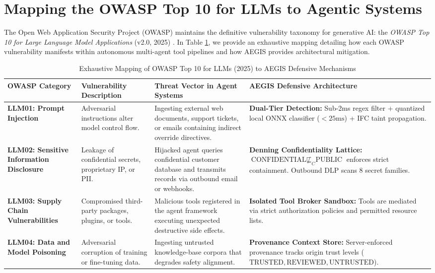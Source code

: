 \section{Mapping the OWASP Top 10 for LLMs to Agentic Systems}
The Open Web Application Security Project (OWASP) maintains the definitive vulnerability taxonomy for generative AI: the \textit{OWASP Top 10 for Large Language Model Applications} (v2.0, 2025) \cite{owasp2025top10llm}. In Table \ref{tab:owasp}, we provide an exhaustive mapping detailing how each OWASP vulnerability manifests within autonomous multi-agent tool pipelines and how AEGIS provides architectural mitigation.

\begin{table}[htbp]
\centering
\scriptsize
\caption{Exhaustive Mapping of OWASP Top 10 for LLMs (2025) to AEGIS Defensive Mechanisms}
\label{tab:owasp}
\begin{tabularx}{\textwidth}{p{2.2cm}p{3.0cm}p{4.2cm}X}
\toprule
\textbf{OWASP Category} & \textbf{Vulnerability Description} & \textbf{Threat Vector in Agent Systems} & \textbf{AEGIS Defensive Architecture} \\
\midrule
\textbf{LLM01: Prompt Injection} & Adversarial instructions alter model control flow. & Ingesting external web documents, support tickets, or emails containing indirect override directives. & \textbf{Dual-Tier Detection:} Sub-2ms regex filter + quantized local ONNX classifier ($< 25\text{ms}$) + IFC taint propagation. \\
\addlinespace
\textbf{LLM02: Sensitive Information Disclosure} & Leakage of confidential secrets, proprietary IP, or PII. & Hijacked agent queries confidential customer database and transmits records via outbound email or webhooks. & \textbf{Denning Confidentiality Lattice:} $\text{CONFIDENTIAL} \not\sqsubseteq_C \text{PUBLIC}$ enforces strict containment. Outbound DLP scans 8 secret families. \\
\addlinespace
\textbf{LLM03: Supply Chain Vulnerabilities} & Compromised third-party packages, plugins, or tools. & Malicious tools registered in the agent framework executing unexpected destructive side effects. & \textbf{Isolated Tool Broker Sandbox:} Tools are mediated via strict authorization policies and permitted resource lists. \\
\addlinespace
\textbf{LLM04: Data and Model Poisoning} & Adversarial corruption of training or fine-tuning data. & Ingesting untrusted knowledge-base corpora that degrades safety alignment. & \textbf{Provenance Context Store:} Server-enforced provenance tracks origin trust levels ($\text{TRUSTED}, \text{REVIEWED}, \text{UNTRUSTED}$). \\

\end{tabularx}
\end{table}
